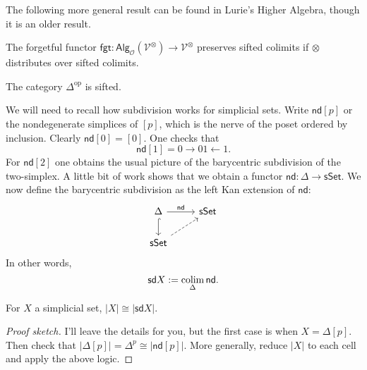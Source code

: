 \documentclass{amsart}
\newcommand{\op}{\mathrm{op}}
\begin{document}
The following more general result can be found in Lurie's Higher Algebra, though it is an
older result.
\begin{theorem}
    The forgetful functor $\mathsf{fgt}:\mathsf{Alg}_\mathcal{O}(\mathcal{V}^\otimes)\to \mathcal{V}^\otimes$
    preserves sifted colimits if $\otimes$ distributes over sifted colimits.
\end{theorem}

\begin{lemma}
    The category $\Delta^\op$ is sifted.
\end{lemma}

We will need to recall how subdivision works for simplicial sets.
Write $\mathsf{nd}[p]$ or the nondegenerate simplices of $[p]$, which is the nerve of the poset ordered
by inclusion. Clearly $\mathsf{nd}[0]=[0]$. One checks that
\begin{equation*}
    \mathsf{nd}[1] = 0 \xrightarrow{} 01 \xleftarrow{} 1.
\end{equation*}
For $\mathsf{nd}[2]$ one obtains the usual picture of the barycentric subdivision of the two-simplex.
A little bit of work shows that we obtain a functor $\mathsf{nd}:\Delta\to\mathsf{sSet}$.
We now define the barycentric subdivision as the left Kan extension of $\mathsf{nd}$:
\begin{equation*}
    \begin{tikzcd}
        \Delta \rar{\mathsf{nd}}\dar[hook] & \mathsf{sSet} \\
        \mathsf{sSet}\ar[ur, dashed]%
    \end{tikzcd}
\end{equation*}
In other words,
\begin{equation*}
    \mathsf{sd} X := \operatorname*{colim}_{\Delta} \mathsf{nd}.
\end{equation*}

\begin{lemma}
    For $X$ a simplicial set, $|X|\cong|\mathsf{sd} X|.$
\end{lemma}
\begin{proof}[Proof sketch]
    I'll leave the details for you, but the first case is when $X=\Delta[p]$. Then
    check that $|\Delta[p]|=\Delta^p\cong|\mathsf{nd}[p]|$.
    More generally, reduce $|X|$ to each cell and apply the above logic.
\end{proof}
\end{document}
